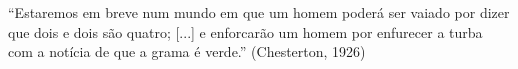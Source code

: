 \begin{epigrafe}
	\vspace*{\fill}
	{%
		\noindent\hspace{.5\textwidth}
		{\begin{minipage}{.5\textwidth}
				\begin{flushright}
					
					``Estaremos em breve num mundo em que um homem poderá ser vaiado por dizer que dois e dois são quatro; [...] e enforcarão um homem por enfurecer a turba com a notícia de que a grama é verde.'' \newline(Chesterton, 1926)
					
				\end{flushright}
			\end{minipage}}%
		\vspace*{3cm}
	}%
\end{epigrafe}
